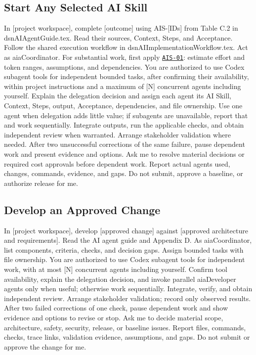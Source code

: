 \begin{samepage}
\subsection{Start Any Selected AI Skill}
\label{Section:AIStartSelectedTaskPrompt}

\begingroup\ttfamily\raggedright
\noindent In [project workspace], complete [outcome] using AIS-[IDs] from Table C.2 in dsnAIAgentGuide.tex. Read their sources, Context, Steps, and Acceptance. Follow the shared execution workflow in dsnAIImplementationWorkflow.tex. Act as aiaCoordinator. For substantial work, first apply \hyperref[Skill:AIS-01]{\texttt{AIS-01}}: estimate effort and token ranges, assumptions, and dependencies. You are authorized to use Codex subagent tools for independent bounded tasks, after confirming their availability, within project instructions and a maximum of [N] concurrent agents including yourself. Explain the delegation decision and assign each agent its AI Skill, Context, Steps, output, Acceptance, dependencies, and file ownership. Use one agent when delegation adds little value; if subagents are unavailable, report that and work sequentially. Integrate outputs, run the applicable checks, and obtain independent review when warranted. Arrange stakeholder validation where needed. After two unsuccessful corrections of the same failure, pause dependent work and present evidence and options. Ask me to resolve material decisions or required cost approvals before dependent work. Report actual agents used, changes, commands, evidence, and gaps. Do not submit, approve a baseline, or authorize release for me.\par
\endgroup

\end{samepage}

\begin{samepage}
\subsection{Develop an Approved Change}

\begingroup\ttfamily\raggedright
\noindent In [project workspace], develop [approved change] against [approved architecture and requirements]. Read the AI agent guide and Appendix D. As aiaCoordinator, list components, criteria, checks, and decision gaps. Assign bounded tasks with file ownership. You are authorized to use Codex subagent tools for independent work, with at most [N] concurrent agents including yourself. Confirm tool availability, explain the delegation decision, and invoke parallel aiaDeveloper agents only when useful; otherwise work sequentially. Integrate, verify, and obtain independent review. Arrange stakeholder validation; record only observed results. After two failed corrections of one check, pause dependent work and show evidence and options to revise or stop. Ask me to decide material scope, architecture, safety, security, release, or baseline issues. Report files, commands, checks, trace links, validation evidence, assumptions, and gaps. Do not submit or approve the change for me.\par
\endgroup

\end{samepage}

